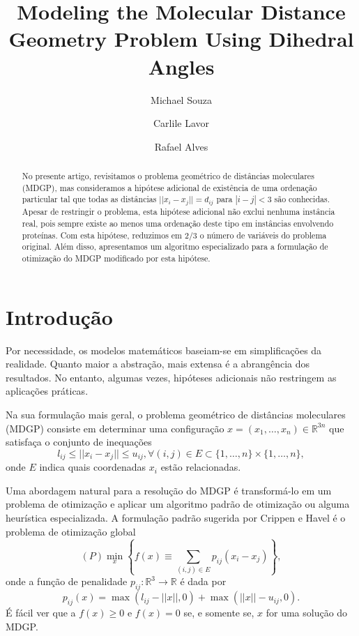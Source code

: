 \documentclass[10pt,a4paper]{article}
\author{Michael Souza\and Carlile Lavor\and Rafael Alves}
\title{Modeling the Molecular Distance Geometry Problem Using Dihedral Angles}
\newcommand{\R}{\mathbb{R}}
\begin{document}
\maketitle
\begin{abstract}
	No presente artigo, revisitamos o problema geométrico de distâncias moleculares (MDGP), mas consideramos a hipótese adicional de existência de uma ordenação particular tal que todas as distâncias $||x_i-x_j||=d_{ij}$ para $|i-j|<3$ são conhecidas. Apesar de restringir o problema, esta hipótese adicional não exclui nenhuma instância real, pois sempre existe ao menos uma ordenação deste tipo em instâncias envolvendo proteínas. Com esta hipótese, reduzimos em 2/3 o número de variáveis do problema original. Além disso, apresentamos um algoritmo especializado para a formulação de otimização do MDGP modificado por esta hipótese.
\end{abstract}

\section{Introdução}\label{sec:intro}
Por necessidade, os modelos matemáticos baseiam-se em simplificações da realidade. Quanto maior a abstração, mais extensa é a abrangência dos resultados. No entanto, algumas vezes, hipóteses adicionais não restringem as aplicações práticas.

Na sua formulação mais geral, o problema geométrico de distâncias moleculares (MDGP) consiste em determinar uma configuração $x=(x_1,\ldots,x_n)\in\R^{3n}$ que satisfaça o conjunto de inequações
\begin{equation}
l_{ij} \leq ||x_i-x_j|| \leq u_{ij}, \forall (i,j) \in E \subset \{1,\ldots,n\}\times \{1,\ldots,n\},
\end{equation}
onde $E$ indica quais coordenadas $x_i$ estão relacionadas. 

Uma abordagem natural para a resolução do MDGP é transformá-lo em um problema de otimização e aplicar um algoritmo padrão de otimização ou alguma heurística especializada. A formulação padrão sugerida por Crippen e Havel \cite{Crippen1988} é o problema de otimização global
\begin{equation}
(P) \min_x \left\{f(x)\equiv\sum_{(i,j)\in E}p_{ij}(x_i-x_j)\right\},
\end{equation}
onde a função de penalidade $p_{ij}:\R^3\to\R$ é dada por
\begin{equation}\label{eq:opt_form}
p_{ij}(x) = \max(l_{ij} - ||x||, 0) + \max(||x|| - u_{ij},0).
\end{equation}
É fácil ver que a $f(x)\geq 0$ e $f(x)=0$ se, e somente se, $x$ for uma solução do MDGP. 
\end{document}
